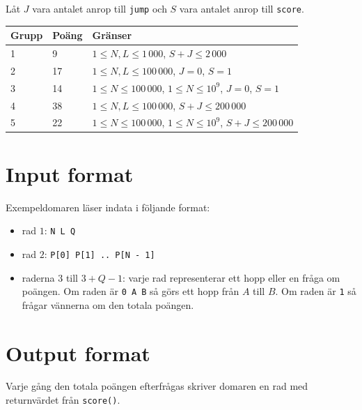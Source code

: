 Låt $J$ vara antalet anrop till \texttt{jump} och $S$ vara antalet anrop till \texttt{score}.

\begin{tabular}{|l|l|l|}
  \hline
  \textbf{Grupp} & \textbf{Poäng} & \textbf{Gränser} \\ \hline
  1 & 9 & $1 \le N, L \le 1\,000$,  $S + J \le 2\,000$ \\ \hline
  2 & 17 & $1 \le N, L \le 100\,000$, $J = 0$, $S = 1$ \\ \hline
  3 & 14 & $1 \le N \le 100\,000$, $1 \le N \le 10^9$, $J = 0$, $S = 1$ \\ \hline
  4 & 38 & $1 \le N, L \le 100\,000$, $S + J \le 200\,000$ \\ \hline
  5 & 22 & $1 \le N \le 100\,000$, $1 \le N \le 10^9$, $S + J \le 200\,000$ \\ \hline
\end{tabular}

\section*{Input format}
Exempeldomaren läser indata i följande format:

\begin{itemize}
  \item rad $1$: \texttt{N L Q}
  \item rad $2$: \texttt{P[0] P[1] .. P[N - 1]}
  \item raderna $3$ till $3 + Q - 1$: varje rad representerar ett hopp eller en fråga om poängen.
    Om raden är \texttt{0 A B} så görs ett hopp från $A$ till $B$. Om raden är \texttt{1} så frågar vännerna om den totala poängen.
\end{itemize}

\section*{Output format}
Varje gång den totala poängen efterfrågas skriver domaren en rad med returnvärdet från \texttt{score()}.
